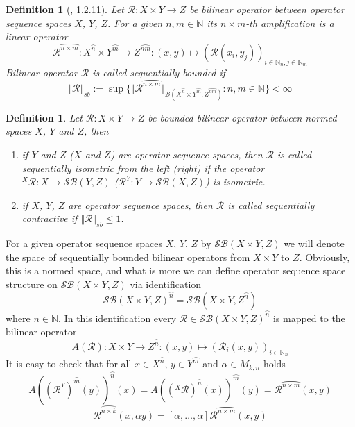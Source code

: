 \documentclass[12pt]{article}
\newtheorem{definition}[theorem]{Definition}
\begin{document}
\begin{definition}[\cite{LamOpFolgen}, 1.2.11]\label{DefSBbiOp}
Let $\mathcal{R}:X\times Y\to Z$ be bilinear operator between operator sequence 
spaces $X$, $Y$, $Z$. For a given $n,m\in\mathbb{N}$ its $n\times m$-th 
amplification is a linear operator
$$
\mathcal{R}^{\wideparen{n\times m}}
:X^{\wideparen{n}}\times Y^{\wideparen{m}}\to Z^{\wideparen{nm}}
:(x,y)\mapsto{(\mathcal{R}(x_i,y_j))}_{i\in\mathbb{N}_n,j\in\mathbb{N}_m}
$$
Bilinear operator $\mathcal{R}$ is called sequentially bounded if
$$
\Vert\mathcal{R}\Vert_{sb}:=\sup \{\Vert \mathcal{R}^{\wideparen{n\times
m}}\Vert_{\mathcal{B}(X^{\wideparen{n}}\times Y^{\wideparen{m}},
Z^{\wideparen{nm}})}:n,m\in\mathbb{N} \}<\infty
$$
\end{definition}

\begin{definition}\label{DefSBBiOpType}
Let $\mathcal{R}:X\times Y\to Z$ be bounded bilinear operator between normed 
spaces $X$, $Y$ and $Z$, then
\begin{enumerate}[label = (\roman*)]
    \item if $Y$ and $Z$ ($X$ and $Z$) are operator sequence spaces, 
    then $\mathcal{R}$ is called sequentially isometric from the left (right) if 
    the operator 
    ${}^X\mathcal{R}
    :X\to\mathcal{SB}(Y,Z)$ ($\mathcal{R}^Y
    :Y\to\mathcal{SB}(X,Z)$) 
    is isometric.

    \item if $X$, $Y$, $Z$ are operator sequence spaces, then $\mathcal{R}$ is 
    called sequentially contractive if $\Vert \mathcal{R}\Vert_{sb}\leq 1$.
\end{enumerate}
\end{definition}

For a given operator sequence spaces $X$, $Y$, $Z$ by 
$\mathcal{SB}(X\times Y, Z)$ we will denote the space of sequentially bounded 
bilinear operators from $X\times Y$ to $Z$. Obviously, this is a normed space, 
and what is more we can define operator sequence space structure on 
$\mathcal{SB}(X\times Y, Z)$ via identification
$$
{\mathcal{SB}(X\times Y, Z)}^{\wideparen{n}}=\mathcal{SB}(X\times
Y,Z^{\wideparen{n}})
$$
where $n\in\mathbb{N}$. In this identification every 
$\mathcal{R}\in{\mathcal{SB}(X\times Y,Z)}^{\wideparen{n}}$ is mapped to the 
bilinear operator 
$$
A(\mathcal{R}):X\times Y\to
Z^{\wideparen{n}}:(x,y)\mapsto{(\mathcal{R}_i(x,y))}_{i\in\mathbb{N}_n}
$$
It is easy to check that for all $x\in X^{\wideparen{n}}$, 
$y\in Y^{\wideparen{m}}$ and $\alpha\in M_{k,n}$  holds
$$
{A({(\mathcal{R}^Y)}^{\wideparen{m}}(y))}^{\wideparen{n}}(x)
={A({({}^X\mathcal{R})}^{\wideparen{n}}(x))}^{\wideparen{m}}(y)
=\mathcal{R}^{\wideparen{n\times m}}(x,y)
$$
$$
\mathcal{R}^{\wideparen{n\times k}}(x,\alpha y)
=[\alpha,\ldots,\alpha]\mathcal{R}^{\wideparen{n\times m}}(x,y)
$$
\end{document}
